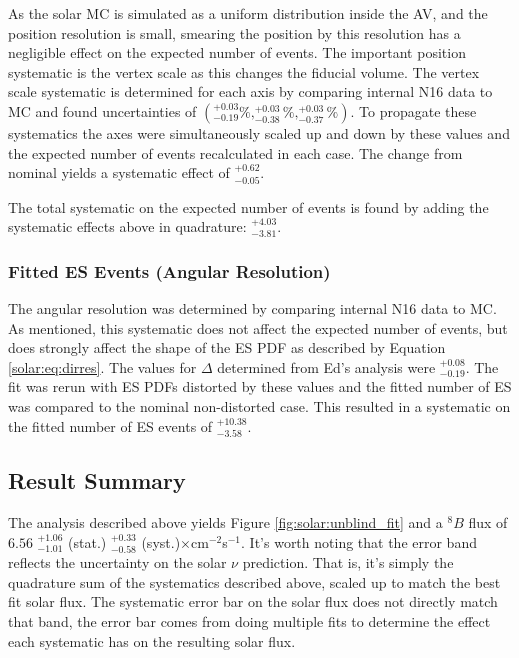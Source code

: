 As the solar MC is simulated as a uniform distribution inside the AV, and the
position resolution is small, smearing the position by this resolution has a 
negligible effect on the expected number of events.
The important position systematic is the vertex scale as this changes the 
fiducial volume.
The vertex scale systematic is determined for each axis by comparing
internal N16 data to MC and found uncertainties of
$(^{+0.03}_{-0.19}\%,^{+0.03}_{-0.38}\%,^{+0.03}_{-0.37}\%)$.
To propagate these systematics the axes were simultaneously scaled up and down
by these values and the expected number of events recalculated in each case.
The change from nominal yields a systematic effect of $^{+0.62}_{-0.05}$.

The total systematic on the expected number of events is found by adding the
systematic effects above in quadrature: $^{+4.03}_{-3.81}$.

\subsubsection{Fitted ES Events (Angular Resolution)}

The angular resolution was determined by comparing internal N16 
data to MC. As mentioned, this systematic does not affect the expected 
number of events, but does strongly affect the shape of the ES PDF as 
described by Equation \ref{solar:eq:dirres}.
The values for $\Delta$ determined from Ed's analysis were $^{+0.08}_{-0.19}$.
The fit was rerun with ES PDFs distorted by these values and the fitted 
number of ES was compared to the nominal non-distorted case.
This resulted in a systematic on the fitted number of ES events of 
$^{+10.38}_{-3.58}$.

\subsection{Result Summary}

The analysis described above yields Figure \ref{fig:solar:unblind_fit} and a 
$^8B$ flux of
$6.56$ $^{+1.06}_{-1.01}$ (stat.) $^{+0.33}_{-0.58}$ (syst.)$\times$cm$^{-2}$s$^{-1}$.
It's worth noting that the error band reflects the uncertainty on the solar
$\nu$ prediction.
That is, it's simply the quadrature sum of the systematics described above,
scaled up to match the best fit solar flux.
The systematic error bar on the solar flux does not directly match that band,
the error bar comes from doing multiple fits to determine the effect each systematic
has on the resulting solar flux.

